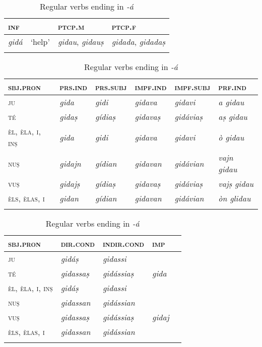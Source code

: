 \begin{table}
	\caption{Regular verbs ending in \textit{-á}}
	\label{conja}
	\begin{tabularx}{.7\textwidth}{llll}
		
		\lsptoprule
		\textsc{inf} & & \textsc{ptcp.m}  & \textsc{ptcp.f}\\
		\midrule
		\textit{gidá} & `help' & \textit{gidau}, \textit{gidauṣ} & \textit{gidada}, \textit{gidadaṣ}\\
		\lspbottomrule  
	\end{tabularx}
	
	\medskip
	
	\begin{tabularx}{\textwidth}{p{2cm}lllll}
		\lsptoprule
		\textsc{sbj.pron} &\textsc{prs.ind} &\textsc{prs.subj} &\textsc{impf.ind} & \textsc{impf.subj} &\textsc{prf.ind}\\
		\midrule
		\textsc{ju} & \textit{gida} & \textit{gidi} & \textit{gidava} & \textit{gidavi} & \textit{a gidau}  \\
		\textsc{té} & \textit{gidaṣ} & \textit{gídiaṣ} & \textit{gidavaṣ} & \textit{gidáviaṣ} & \textit{aṣ gidau}\\
		\textsc{èl, èla, i, inṣ} & \textit{gida} & \textit{gidi} & \textit{gidava} & \textit{gidavi}  & \textit{ò gidau} \\
		\textsc{nuṣ} & \textit{gidajn} & \textit{gídian} & \textit{gidavan} & \textit{gidávian} & \textit{vajn gidau} \\
		\textsc{vuṣ} & \textit{gidajṣ} & \textit{gídiaṣ} & \textit{gidavaṣ}  & \textit{gidáviaṣ} & \textit{vajṣ gidau} \\
		\textsc{èls, èlas, i} & \textit{gidan}  & \textit{gídian} & \textit{gidavan} & \textit{gidávian} & \textit{òn glidau}\\
		\lspbottomrule
	\end{tabularx}
	
	\medskip
	
	\begin{tabularx} {\textwidth}{p{2cm}XXXX}
		\lsptoprule
		\textsc{sbj.pron} &\textsc{dir.cond} &  \textsc{indir.cond} & \textsc{imp}\\
		\midrule
		\textsc{ju} & \textit{gidáṣ} & \textit{gidassi}\\
		\textsc{té} & \textit{gidassaṣ} & \textit{gidássiaṣ} & \textit{gida}\\
		\textsc{èl, èla, i, inṣ} & \textit{gidáṣ} &  \textit{gidassi}\\
		\textsc{nuṣ} & \textit{gidassan} & \textit{gidássian}\\
		\textsc{vuṣ} & \textit{gidassaṣ} & \textit{gidássiaṣ}  & \textit{gidaj}\\
		\textsc{èls, èlas, i} & \textit{gidassan}  & \textit{gidássian} \\
		\lspbottomrule
	\end{tabularx} 
\end{table}



